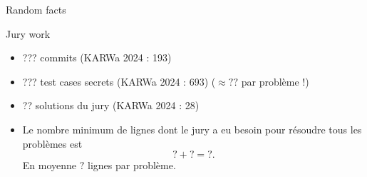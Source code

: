 
\begin{frame}{Random facts}
    \begin{block}{Jury work}
      \begin{itemize}[<+->]
        \item ??? commits (KARWa 2024 : 193)
        \item ??? test cases secrets (KARWa 2024 : 693) ($\approx ??$ par problème !)
        \item ?? solutions du jury (KARWa 2024 : 28)
        \item Le nombre minimum de lignes dont le jury a eu besoin pour résoudre tous les problèmes est
        \[ ?+? = ?. \]
        En moyenne $?$ lignes par problème.
      \end{itemize}
    \end{block}
\end{frame}
